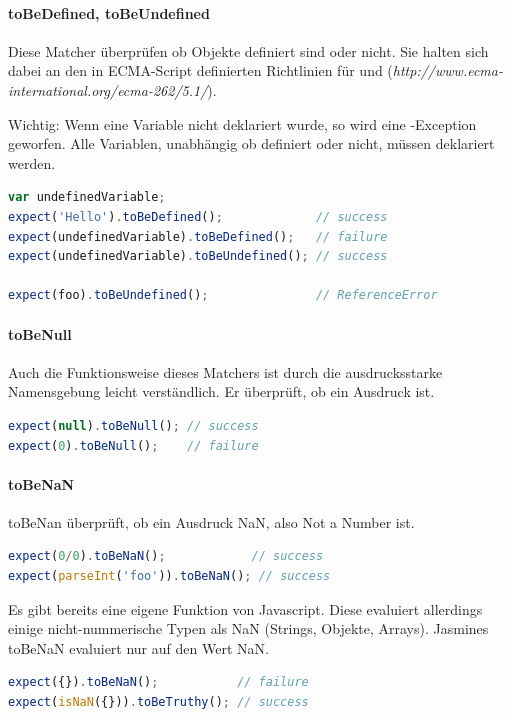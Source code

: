 {\paragraph{toBeDefined, toBeUndefined}
Diese Matcher überprüfen ob Objekte definiert sind oder nicht. Sie halten sich dabei an den in ECMA-Script definierten Richtlinien für  und  (\textit{http://www.ecma-international.org/ecma-262/5.1/}).

Wichtig: Wenn eine Variable nicht deklariert wurde, so wird eine -Exception geworfen. Alle Variablen, unabhängig ob definiert oder nicht, müssen deklariert werden.
\begin{lstlisting}[language=JavaScript]
var undefinedVariable;
expect('Hello').toBeDefined();             // success
expect(undefinedVariable).toBeDefined();   // failure
expect(undefinedVariable).toBeUndefined(); // success

expect(foo).toBeUndefined();               // ReferenceError
\end{lstlisting}

\paragraph{toBeNull}
Auch die Funktionsweise dieses Matchers ist durch die ausdrucksstarke Namensgebung leicht verständlich. Er überprüft, ob ein Ausdruck  ist.
\begin{lstlisting}[language=JavaScript]
expect(null).toBeNull(); // success
expect(0).toBeNull();    // failure
\end{lstlisting}

\paragraph{toBeNaN}
toBeNan überprüft, ob ein Ausdruck NaN, also Not a Number ist.
\begin{lstlisting}[language=JavaScript]
expect(0/0).toBeNaN();            // success
expect(parseInt('foo')).toBeNaN(); // success
\end{lstlisting}

Es gibt bereits eine eigene  Funktion von Javascript. Diese evaluiert allerdings einige nicht-nummerische Typen als NaN (Strings, Objekte, Arrays). Jasmines toBeNaN evaluiert nur auf den Wert NaN.

\begin{lstlisting}[language=JavaScript]
expect({}).toBeNaN();           // failure
expect(isNaN({})).toBeTruthy(); // success
\end{lstlisting}

}
